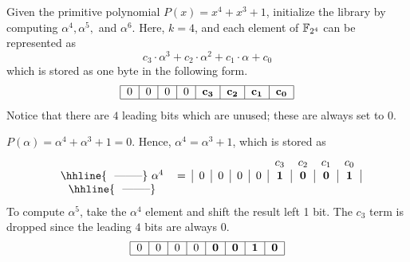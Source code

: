 \begin{Example}
\label{ex:gf4init}
Given the primitive polynomial $P(x)=x^4+x^3+1$, initialize the library by computing
$\alpha^4,\alpha^5,$ and $\alpha^6$. Here, $k=4$, and each element of ${\mathbb{F}}_{2^4}$ can be 
represented as
\begin{equation}
c_3\cdot\alpha^3+c_2\cdot\alpha^2+c_1\cdot\alpha+c_0
\end{equation}
which is stored as one byte in the following form.
\begin{equation}
\begin{tabular}{|c|c|c|c|c|c|c|c|} 
\hline
$0$ & $0$ & $0$ & $0$ & $\mathbf{c_3}$ & $\mathbf{c_2}$ & $\mathbf{c_1}$ & $\mathbf{c_0}$ \\
\hline
\end{tabular}
\end{equation}
Notice that there are $4$ leading bits which are unused; these are always set to $0$.

$P(\alpha)=\alpha^4+\alpha^3+1=0$. Hence, $\alpha^4=\alpha^3+1$, 
which is stored as
\begin{equation}
\begin{tabular}{cc|c|c|c|c|c|c|c|c|} 
\multicolumn{6}{c}{}&\multicolumn{1}{c}{$c_3$}&\multicolumn{1}{c}{$c_2$}&\multicolumn{1}{c}{$c_1$}&\multicolumn{1}{c}{$c_0$} \\
\hhline{~~--------}
$\alpha^4$&$=$&$0$ & $0$ & $0$ & $0$ & $\mathbf{1}$ & $\mathbf{0}$ & $\mathbf{0}$ & $\mathbf{1}$ \\
\hhline{~~--------}
\end{tabular}
\end{equation}
To compute $\alpha^5$, take the $\alpha^4$ element and
shift the result left 1 bit. The $c_3$ term is dropped since the leading $4$ 
bits are always $0$.
\begin{equation}
\begin{tabular}{|c|c|c|c|c|c|c|c|} 
\hline
$0$ & $0$ & $0$ & $0$ & $\mathbf{0}$ & $\mathbf{0}$ & $\mathbf{1}$ & $\mathbf{0}$ \\
\hline
\end{tabular}
\end{equation}


\end{Example}
